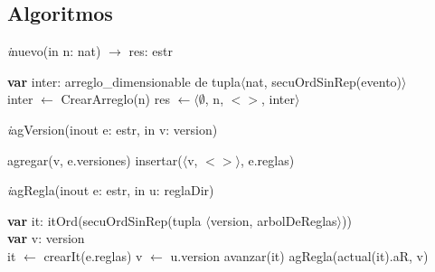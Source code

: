 \subsection*{Algoritmos}

\incmargin{1em}
\linesnumbered
{}
\dontprintsemicolon

\textit{i}nuevo(in n: nat) $\longrightarrow$ res: estr \\
\begin{algorithm}[H]
\BlankLine
\textbf{var} inter: arreglo\_dimensionable de tupla$\langle$nat, secuOrdSinRep(evento)$\rangle$ \\
\BlankLine
inter $\leftarrow$ CrearArreglo(n)
\BlankLine
{}
\BlankLine
res $\leftarrow \langle \emptyset$, n, $<>$, inter$\rangle$
\end{algorithm}

\vspace{11pt}

\textit{i}agVersion(inout e: estr, in v: version)\\
\begin{algorithm}[H]
\BlankLine
agregar(v, e.versiones)
insertar($\langle$v, $<>\rangle$, e.reglas)
\end{algorithm}

\vspace{11pt}

\textit{i}agRegla(inout e: estr, in u: reglaDir)\\
\begin{algorithm}[H]
\BlankLine
\textbf{var} it: itOrd(secuOrdSinRep(tupla $\langle$version, arbolDeReglas$\rangle$))\\
\textbf{var} v: version\\
\BlankLine
it $\leftarrow$ crearIt(e.reglas) 
v  $\leftarrow$ u.version 
\BlankLine
{}
{avanzar(it)}
agRegla(actual(it).aR, v) 
\end{algorithm}

\vspace{11pt}

